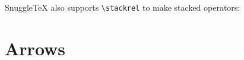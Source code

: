 \begin{rdemotable}
\rdemo{\pm}
\rdemo{\mp}
\rdemo{\times}
\rdemo{\div}
\rdemo{\ast}
\rdemo{\star}
\rdemo{\circ}
\rdemo{\bullet}
\rdemo{\cdot}
\rdemo{\cap}
\rdemo{\cup}
\rdemo{\uplus}
\rdemo{\sqcap}
\rdemo{\sqcup}
\rdemo{\vee}
\rdemo{\lor}
\rdemo{\wedge}
\rdemo{\land}
\rdemo{\setminus}
\rdemo{\wr}
\rdemo{\diamond}
\rdemo{\bigtriangleup}
\rdemo{\bigtriangledown}
\rdemo{\triangleleft}
\rdemo{\triangleright}
\rdemo{\oplus}
\rdemo{\ominus}
\rdemo{\otimes}
\rdemo{\oslash}
\rdemo{\odot}
\rdemo{\bigcirc}
\rdemo{\dagger}
\rdemo{\ddagger}
\rdemo{\amalg}
\rndemo{\leq}
\rndemo{\le}
\rndemo{\prec}
\rdemo{\preceq}
\rdemo{\ll}
\rndemo{\subset}
\rndemo{\subseteq}
\rdemo{\sqsubset}
\rndemo{\sqsubseteq}
\rndemo{\in}
\rndemo{\vdash}
\rndemo{\geq}
\rndemo{\ge}
\rndemo{\succ}
\rdemo{\succeq}
\rdemo{\gg}
\rndemo{\supset}
\rndemo{\supseteq}
\rdemo{\sqsupset}
\rndemo{\sqsupseteq}
\rndemo{\ni}
\rdemo{\dashv}
\rndemo{\equiv}
\rndemo{\sim}
\rndemo{\simeq}
\rdemo{\asymp}
\rndemo{\approx}
\rndemo{\cong}
\rdemo{\neq}
\rdemo{\doteq}
\rdemo{\notin}
\rdemo{\models}
\rdemo{\perp}
\rndemo{\mid}
\rdemo{\parallel}
\rdemo{\bowtie}
\rdemo{\smile}
\rdemo{\frown}
\rdemo{\propto}
\end{rdemotable}

SnuggleTeX also supports \verb|\stackrel| to make stacked operators:

\begin{demotable}
\end{demotable}

\section*{Arrows}

\begin{demotable}
\mdemo{\leftarrow}
\mdemo{\Leftarrow}
\mdemo{\rightarrow}
\mdemo{\Rightarrow}
\mdemo{\leftrightarrow}
\mdemo{\Leftrightarrow}
\mdemo{\mapsto}
\mdemo{\hookleftarrow}
\mdemo{\leftharpoonup}
\mdemo{\leftharpoondown}
\mdemo{\rightleftharpoons}
\mdemo{\longleftarrow}
\mdemo{\Longleftarrow}
\mdemo{\longrightarrow}
\mdemo{\Longrightarrow}
\mdemo{\longleftrightarrow}
\mdemo{\Longleftrightarrow}
\mdemo{\longmapsto}
\mdemo{\hookrightarrow}
\mdemo{\rightharpoonup}
\mdemo{\rightharpoondown}
\mdemo{\uparrow}
\mdemo{\Uparrow}
\mdemo{\downarrow}
\mdemo{\Downarrow}
\mdemo{\updownarrow}
\mdemo{\Updownarrow}
\mdemo{\nearrow}
\mdemo{\searrow}
\mdemo{\swarrow}
\mdemo{\nwarrow}
\end{demotable}

